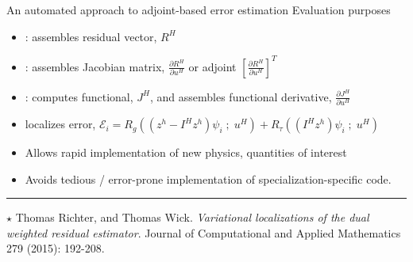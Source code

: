 \documentclass[fleqn]{beamer}
\begin{document}
\begin{frame}{An automated approach to adjoint-based error estimation}
{Evaluation purposes}
\scriptsize
\begin{itemize}
\item {} :
assembles residual vector, $R^H$
\item {} :
assembles Jacobian matrix,
$\frac{\partial R^H}{\partial u^H}$
or adjoint $[\frac{\partial R^H}{\partial u^H} ]^T$
\item {} :
computes functional, $J^H$, and assembles functional derivative,
$\frac{\partial J^H}{\partial u^H}$
\item {}
localizes error,
$\mathcal{E}_i = R_g((z^h - I^H z^h) \psi_i \; ; \; u^H) +
R_{\tau}((I^H z^h) \psi_i \; ; \; u^H)$
\end{itemize}

\begin{itemize}
\item Allows rapid implementation of new physics, quantities of interest
\item Avoids tedious / error-prone implementation of specialization-specific code.
\end{itemize}

\vspace{1em}
\hrule
\vspace{1em}
\scriptsize{
$\star$
Thomas Richter, and Thomas Wick.
\emph{Variational localizations of the dual weighted residual estimator}.
Journal of Computational and Applied Mathematics 279 (2015): 192-208.
}
\end{frame}

\end{document}
